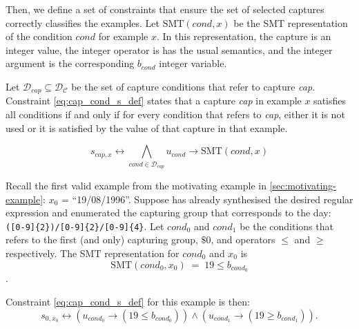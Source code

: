 Then, we define a set of constraints that ensure the set of selected captures correctly classifies the examples.
Let \(\textrm{SMT}(\textit{cond}, x)\) be the \ac{SMT} representation of the condition \(\textit{cond}\) for example \(x\).
In this representation, the capture is an integer value, the integer operator is has the usual semantics, and the integer argument is the corresponding \(b_{\textit{cond}}\) integer variable.

Let \(\mathcal{D}_{cap} \subseteq \mathcal{D}_\mathcal{C}\) be the set of capture conditions that refer to capture \textit{cap}.
Constraint \ref{eq:cap_cond_s_def} states that a capture \textit{cap} in example \(x\) satisfies all conditions if and only if for every condition that refers to \textit{cap}, either it is not used or it is satisfied by the value of that capture in that example.

\begin{equation}\label{eq:cap_cond_s_def}
    s_{cap,x} \leftrightarrow \bigwedge_{cond \in \mathcal{D}_{\textit{cap}}} u_{cond} \rightarrow \textrm{SMT}(\textit{cond}, x)
\end{equation}

\begin{example}
Recall the first valid example from the motivating example in \autoref{sec:motivating-example}: \(x_0\) = ``19/08/1996''.
%
Suppose \Forest has already synthesised the desired regular expression and enumerated the capturing group that corresponds to the day: \verb`([0-9]{2})/[0-9]{2}/[0-9]{4}`. 
%
Let \(\textit{cond}_0\) and \(\textit{cond}_1\) be the conditions that refers to the first (and only) capturing group, \(\$0\), and operators \(\le\) and \(\ge\) respectively.
%
The SMT representation for \(\textit{cond}_0\) %
and \(x_0\) is
%
\[\textrm{SMT}(\textit{cond}_0, x_0)\; =\;  19 \le b_{\textit{cond}_0}\]. 

\noindent
Constraint \ref{eq:cap_cond_s_def} for this example is then:
%
\begin{equation*}
    s_{0,x_0} \leftrightarrow (u_{\textit{cond}_0} \rightarrow (19 \le b_{\textit{cond}_0}))
    \land (u_{\textit{cond}_1} \rightarrow (19 \ge b_{\textit{cond}_1})).
\end{equation*}

\end{example}


